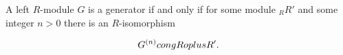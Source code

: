 A left $R$-module $G$ is a generator if and only if for some module ${}_R R'$ and some integer $n > 0$ there is an $R$-isomorphism

$$G^{(n)} \\cong R \\oplus R'.$$
